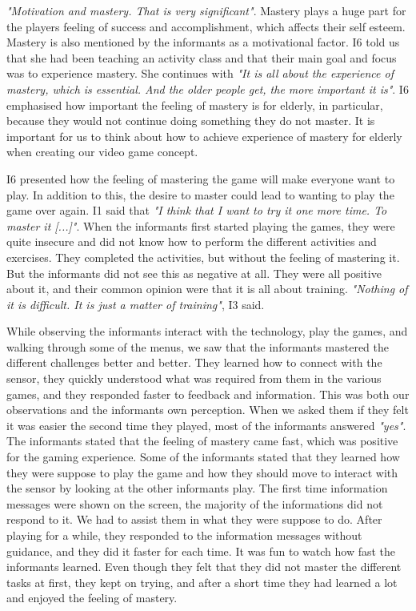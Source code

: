\emph{"Motivation and mastery. That is very significant"}. Mastery plays a huge part for the players feeling of success and accomplishment, which affects their self esteem. Mastery is also mentioned by the informants as a motivational factor. I6 told us that she had been teaching an activity class and that their main goal and focus was to experience mastery. She continues with \emph{"It is all about the experience of mastery, which is essential. And the older people get, the more important it is"}. I6 emphasised how important the feeling of mastery is for elderly, in particular, because they would not continue doing something they do not master. It is important for us to think about how to achieve experience of mastery for elderly when creating our video game concept. 
  
I6 presented how the feeling of mastering the game will make everyone want to play. In addition to this, the desire to master could lead to wanting to play the game over again. I1 said that \emph{"I think that I want to try it one more time. To master it [...]"}. When the informants first started playing the games, they were quite insecure and did not know how to perform the different activities and exercises. They completed the activities, but without the feeling of mastering it. But the informants did not see this as negative at all. They were all positive about it, and their common opinion were that it is all about training. \emph{"Nothing of it is difficult. It is just a matter of training"}, I3 said. 

While observing the informants interact with the technology, play the games, and walking through some of the menus, we saw that the informants mastered the different challenges better and better. They learned how to connect with the sensor, they quickly understood what was required from them in the various games, and they responded faster to feedback and information. This was both our observations and the informants own perception. When we asked them if they felt it was easier the second time they played, most of the informants answered \emph{"yes"}. The informants stated that the feeling of mastery came fast, which was positive for the gaming experience. Some of the informants stated that they learned how they were suppose to play the game and how they should move to interact with the sensor by looking at the other informants play. The first time information messages were shown on the screen, the majority of the informations did not respond to it. We had to assist them in what they were suppose to do. After playing for a while, they responded to the information messages without guidance, and they did it faster for each time. It was fun to watch how fast the informants learned. Even though they felt that they did not master the different tasks at first, they kept on trying, and after a short time they had learned a lot and enjoyed the feeling of mastery. 

